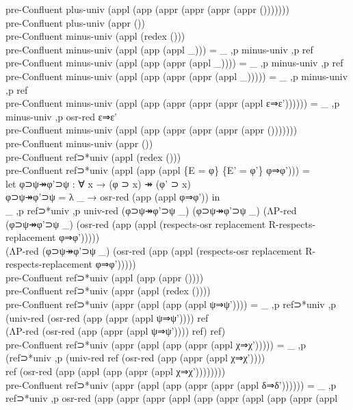 {\begin{code}
{\>pre-Confluent plus-univ (appl (app (appr (appr (appr (appr ()))))))\<\\
\>pre-Confluent plus-univ (appr ())\<\\
\>pre-Confluent minus-univ (appl (redex ()))\<\\
\>pre-Confluent minus-univ (appl (app (appl \_))) = \_ ,p minus-univ ,p ref\<\\
\>pre-Confluent minus-univ (appl (app (appr (appl \_)))) = \_ ,p minus-univ ,p ref\<\\
\>pre-Confluent minus-univ (appl (app (appr (appr (appl \_))))) = \_ ,p minus-univ ,p ref\<\\
\>pre-Confluent minus-univ (appl (app (appr (appr (appr (appl ε⇒ε')))))) = \_ ,p minus-univ ,p osr-red ε⇒ε'\<\\
\>pre-Confluent minus-univ (appl (app (appr (appr (appr (appr ()))))))\<\\
\>pre-Confluent minus-univ (appr ())\<\\
\>pre-Confluent ref⊃*univ (appl (redex ()))\<\\
\>pre-Confluent ref⊃*univ (appl (app (appl \{E = φ\} \{E' = φ'\} φ⇒φ'))) = \<\\
\>  let φ⊃ψ↠φ'⊃ψ : ∀ x → (φ ⊃ x) ↠ (φ' ⊃ x)\<\\
\>      φ⊃ψ↠φ'⊃ψ = λ \_ → osr-red (app (appl φ⇒φ')) in\<\\
\>  \_ ,p ref⊃*univ ,p univ-red (φ⊃ψ↠φ'⊃ψ \_) (φ⊃ψ↠φ'⊃ψ \_) (ΛP-red (φ⊃ψ↠φ'⊃ψ \_) (osr-red (app (appl (respects-osr replacement R-respects-replacement φ⇒φ'))))) \<\\
\>  (ΛP-red (φ⊃ψ↠φ'⊃ψ \_) (osr-red (app (appl (respects-osr replacement R-respects-replacement φ⇒φ')))))\<\\
\>pre-Confluent ref⊃*univ (appl (app (appr ())))\<\\
\>pre-Confluent ref⊃*univ (appr (appl (redex ())))\<\\
\>pre-Confluent ref⊃*univ (appr (appl (app (appl ψ⇒ψ')))) = \_ ,p ref⊃*univ ,p (univ-red (osr-red (app (appr (appl ψ⇒ψ')))) ref \<\\
\>  (ΛP-red (osr-red (app (appr (appl ψ⇒ψ')))) ref) ref)\<\\
\>pre-Confluent ref⊃*univ (appr (appl (app (appr (appl χ⇒χ'))))) = \_ ,p (ref⊃*univ ,p (univ-red ref (osr-red (app (appr (appl χ⇒χ')))) \<\\
\>  ref (osr-red (app (appl (app (appr (appl χ⇒χ'))))))))\<\\
\>pre-Confluent ref⊃*univ (appr (appl (app (appr (appr (appl δ⇒δ')))))) = \_ ,p ref⊃*univ ,p osr-red (app (appr (appr (appl (app (appr (appl (app (appr (appl \<\\
}
\end{code}}
